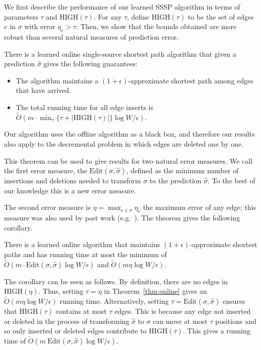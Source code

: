 We first describe the performance of our learned SSSP algorithm in terms of parameters $\tau$ and $\text{HIGH}(\tau)$.  For any $\tau$, define $\text{HIGH}(\tau)$ to be the set of edges $e$ in $\sigma$ with error $\eta_e > \tau$. Then, we show that the bounds obtained are more robust than several natural measures of prediction error.  

\begin{theorem}\label{thm:online}
    There is a learned online single-source shortest path algorithm that given a prediction $\hat{\sigma}$ gives the following guarantees:
    \begin{itemize}[noitemsep, nolistsep]
        \item The algorithm maintains a $(1+\epsilon)$-approximate shortest path among edges that have arrived. 
        \item  The total running time for all edge inserts is
        $\tilde{O}(m \cdot \min_{\tau} \{\tau + |\text{HIGH}(\tau)| \} \log W/\epsilon)$.
    \end{itemize}
\end{theorem}

Our algorithm uses the offline algorithm as a black box, and therefore our results also apply to the decremental problem in which edges are deleted one by one.

This theorem can be used to give results for two natural error measures. 
We call the first error measure, the  $\text{Edit}(\sigma,\hat{\sigma})$, defined as the minimum number of insertions and deletions needed to transform $\sigma$ to the prediction $\hat{\sigma}$. To the best of our knowledge this is a new error measure.
  
The second error measure is  $ \eta = \max_{e \in \sigma} \eta_e $  the maximum error of any edge; this measure was also used by past work (e.g.~\cite{BrandFNP24, McCauleyMNS23, McCauleyMoNi24}).
The theorem gives the following corollary.

\begin{corollary}\label{cor:main}
There is a learned online algorithm that maintains $(1+\epsilon)$-approximate shortest paths and has running time at most the minimum of $\tilde{O}(m \cdot \text{Edit}(\sigma,\hat{\sigma}) \log W/\epsilon)$ and $\tilde{O}(m \eta \log W/\epsilon)$.
\end{corollary}
The corollary can be seen as follows. 
By definition, there are no edges in $\text{HIGH}(\eta)$.  Thus, setting $\tau = \eta$ in Theorem~\ref{thm:online}  gives an $\tilde{O}(m \eta \log W/\epsilon)$ running time.  Alternatively, setting $\tau = \text{Edit}(\sigma,\hat{\sigma})$  ensures that $\text{HIGH}(\tau)$
contains at most $\tau$ edges. This is because any edge not inserted or deleted in the process of transforming $\hat{\sigma}$ to $\sigma$ can move at most $\tau$ positions and so only inserted or deleted edges contribute to $\text{HIGH}(\tau)$.
This gives a running time of $\tilde{O}(m\ \text{Edit}(\sigma,\hat{\sigma}) \log W/\epsilon)$.

